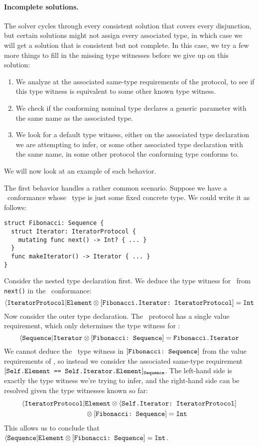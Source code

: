 \documentclass[../generics]{subfiles}
\begin{document}
\paragraph{Incomplete solutions.} The solver cycles through every consistent solution that covers every disjunction, but certain solutions might not assign every associated type, in which case we will get a solution that is consistent but not complete. In this case, we try a few more things to fill in the missing type witnesses before we give up on this solution:
\begin{enumerate}
\item We analyze at the associated same-type requirements of the protocol, to see if this type witness is equivalent to some other known type witness.
\item We check if the conforming nominal type declares a generic parameter with the same name as the associated type.
\item We look for a default type witness, either on the associated type declaration we are attempting to infer, or some other associated type declaration with the same name, in some other protocol the conforming type conforms to.
\end{enumerate}
We will now look at an example of each behavior.

\begin{example}
The first behavior handles a rather common scenario. Suppose we have a \tSequence\ conformance whose \nElement\ type is just some fixed concrete type. We could write it as follows:
\begin{Verbatim}
struct Fibonacci: Sequence {
  struct Iterator: IteratorProtocol {
    mutating func next() -> Int? { ... }
  }
  func makeIterator() -> Iterator { ... }
}
\end{Verbatim}
Consider the nested type declaration first. We deduce the type witness for \nElement\ from \texttt{next()} in the \tIterator\ conformance:
\[\langle\texttt{IteratorProtocol}|\texttt{Element}\otimes[\texttt{Fibonacci.Iterator:~IteratorProtocol}]=\texttt{Int}\]
Now consider the outer type declaration. The \tSequence\ protocol has a single value requirement, which only determines the type witness for \nIterator:
\[\langle\texttt{Sequence}|\texttt{Iterator}\otimes[\texttt{Fibonacci:~Sequence}]=\texttt{Fibonacci.Iterator}\]
We cannot deduce the \nElement\ type witness in $[\texttt{Fibonacci:~Sequence}]$ from the value requirements of \tSequence, so instead we consider the associated same-type requirement $[\texttt{Self.Element == Self.Iterator.Element}]_{\texttt{Sequence}}$. The left-hand side is exactly the type witness we're trying to infer, and the right-hand side can be resolved given the type witnesses known so far:
\begin{gather*}
\langle\texttt{IteratorProtocol}|\texttt{Element} \otimes \langle\texttt{Self.Iterator:~IteratorProtocol}] \\
\qquad {} \otimes [\texttt{Fibonacci:~Sequence}] = \texttt{Int}
\end{gather*}
This allows us to conclude that $\langle\texttt{Sequence}|\texttt{Element} \otimes[\texttt{Fibonacci:~Sequence}] = \texttt{Int}$.
\end{example}
\end{document}

